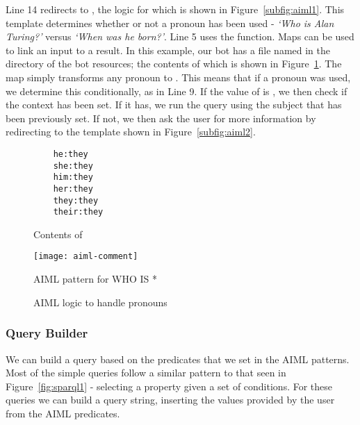 Line 14 redirects to , the logic for which is shown in Figure~\ref{subfig:aiml1}.
This template determines whether or not a pronoun has been used - {\it{`Who is Alan Turing?'}} versus {\it{`When was he born?'}}. Line 5 uses the  function. Maps can be used to link an input to a result. In this example, our bot has a file named  in the  directory of the bot resources; the contents of which is shown in Figure~\ref{fig:pronouns}. The map simply transforms any pronoun to . This means that if a pronoun was used, we determine this conditionally, as in Line 9. If the value of  is , we then check if the context has been set. If it has, we run the query using the subject that has been previously set. If not, we then ask the user for more information by redirecting to the template shown in Figure~\ref{subfig:aiml2}.

\begin{figure}[h]
	\centering
	\begin{lstlisting}
	he:they
	she:they
	him:they
	her:they
	they:they
	their:they
	\end{lstlisting}
	\caption{Contents of }
	\label{fig:pronouns}
\end{figure}

\begin{figure}[pt]
	\centering
	\texttt{[image: aiml-comment]}
	\caption{AIML pattern for WHO IS *}
	\label{fig:aiml-comment}
	\qquad
	\caption{AIML logic to handle pronouns}
	\label{fig:aiml-pronouns}
\end{figure}

\newpage
\subsubsection{Query Builder}
We can build a query based on the predicates that we set in the AIML patterns. Most of the simple queries follow a similar pattern to that seen in Figure~\ref{fig:sparql1} - selecting a property given a set of conditions. For these queries we can build a query string, inserting the values provided by the user from the AIML predicates.

